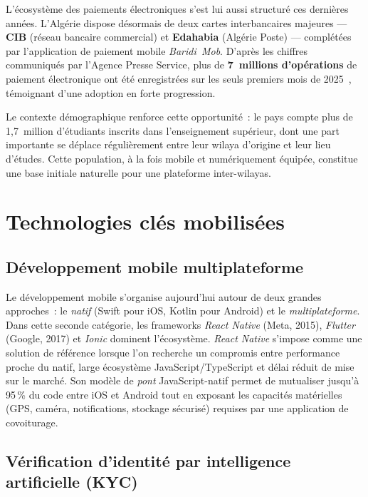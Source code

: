 \documentclass[12pt, a4paper, oneside]{report}
\begin{document}
L'écosystème des paiements électroniques s'est lui aussi structuré ces dernières années. L'Algérie dispose désormais de deux cartes interbancaires majeures --- \textbf{CIB} (réseau bancaire commercial) et \textbf{Edahabia} (Algérie Poste) --- complétées par l'application de paiement mobile \textit{Baridi~Mob}. D'après les chiffres communiqués par l'Agence Presse Service, plus de \textbf{7~millions d'opérations} de paiement électronique ont été enregistrées sur les seuls premiers mois de 2025~\cite{aps_epaiement_2025}, témoignant d'une adoption en forte progression.

Le contexte démographique renforce cette opportunité~: le pays compte plus de 1,7~million d'étudiants inscrits dans l'enseignement supérieur, dont une part importante se déplace régulièrement entre leur wilaya d'origine et leur lieu d'études. Cette population, à la fois mobile et numériquement équipée, constitue une base initiale naturelle pour une plateforme inter-wilayas.

\section{Technologies clés mobilisées}
\label{sec:technologies}

\subsection{Développement mobile multiplateforme}

Le développement mobile s'organise aujourd'hui autour de deux grandes approches~: le \textit{natif} (Swift pour iOS, Kotlin pour Android) et le \textit{multiplateforme}. Dans cette seconde catégorie, les frameworks \textit{React Native} (Meta, 2015), \textit{Flutter} (Google, 2017) et \textit{Ionic} dominent l'écosystème. \textit{React Native} s'impose comme une solution de référence lorsque l'on recherche un compromis entre performance proche du natif, large écosystème JavaScript/TypeScript et délai réduit de mise sur le marché. Son modèle de \textit{pont} JavaScript-natif permet de mutualiser jusqu'à 95\,\% du code entre iOS et Android tout en exposant les capacités matérielles (GPS, caméra, notifications, stockage sécurisé) requises par une application de covoiturage.

\subsection{Vérification d'identité par intelligence artificielle (KYC)}
\end{document}
